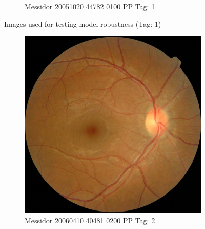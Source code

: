 \begin{figure}[ht!]
\begin{subfigure}[b]{0.4\textwidth}
		\caption{Messidor 20051020 44782 0100 PP Tag: 1}		
	\end{subfigure}
	\hfill 
	\caption{Images used for testing model robustness (Tag: 1)}  
	\label{sta:fig:imgs1} 
\end{figure}

\begin{figure}[ht!]
	\centering
	\begin{subfigure}[b]{0.4\textwidth}
		\centering
		\includegraphics[width=\textwidth]{Figures/chapter_stability/20060410_40481_0200_PP/20060410_40481_0200_PP.jpeg}
		\caption{Messidor 20060410 40481 0200 PP Tag: 2}		
	\end{subfigure} ~
	\begin{subfigure}[b]{0.4\textwidth}
		\centering

\end{subfigure}
\end{figure}
